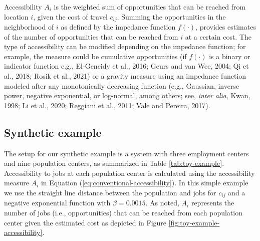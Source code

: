 \documentclass[]{elsarticle} %
\begin{document}
Accessibility \(A_i\) is the weighted sum of opportunities that can be
reached from location \(i\), given the cost of travel \(c_{ij}\).
Summing the opportunities in the neighborhood of \(i\) as defined by the
impedance function \(f(\cdot)\), provides estimates of the number of
opportunities that can be reached from \(i\) at a certain cost. The type
of accessibility can be modified depending on the impedance function;
for example, the measure could be cumulative opportunities (if
\(f(\cdot)\) is a binary or indicator function e.g., El-Geneidy et al.,
2016; Geurs and van Wee, 2004; Qi et al., 2018; Rosik et al., 2021) or a
gravity measure using an impedance function modeled after any
monotonically decreasing function (e.g., Gaussian, inverse power,
negative exponential, or log-normal, among others; see, \emph{inter
alia}, Kwan, 1998; Li et al., 2020; Reggiani et al., 2011; Vale and
Pereira, 2017).

\hypertarget{accessibility-numerical-example}{%
\subsection{Synthetic example}\label{accessibility-numerical-example}}

The setup for our synthetic example is a system with three employment
centers and nine population centers, as summarized in Table
\ref{tab:toy-example}. Accessibility to jobs at each population center
is calculated using the accessibility measure \(A_i\) in Equation
(\ref{eq:conventional-accessibility}). In this simple example we use the
straight line distance between the population and jobs for \(c_{ij}\)
and a negative exponential function with \(\beta = 0.0015\). As noted,
\(A_i\) represents the number of jobs (i.e., opportunities) that can be
reached from each population center given the estimated cost as depicted
in Figure \ref{fig:toy-example-accessibility}.
\end{document}
